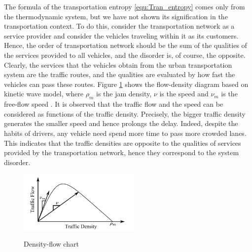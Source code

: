 \documentclass[preprint,authoryear,12pt]{elsarticle}
\begin{document}

The formula of the transportation entropy \eqref{equ:Tran_entropy} comes only from the thermodynamic system, but we have not shown its signification in the transportation context. To do this, consider the transportation network as a service provider and consider the vehicles traveling within it as its customers. Hence, the order of transportation network should be the sum of the qualities of the services provided to all vehicles, and the disorder is, of course, the opposite. Clearly, the services that the vehicles obtain from the urban transportation system are the traffic routes, and the qualities are evaluated by how fast the vehicles can pass these routes. Figure \ref{fig:d_q} shows the flow-density diagram based on kinetic wave model, where $\rho_m$ is the jam density, $\nu$ is the speed and $\nu_m$ is the free-flow speed \citep{ukkusuri_robust_2010}. It is observed that the traffic flow and the speed can be considered as functions of the traffic density. Precisely, the bigger traffic density generates the smaller speed and hence prolongs the delay. Indeed, despite the habits of drivers, any vehicle need spend more time to pass more crowded lanes. This indicates that the traffic densities are opposite to the qualities of services provided by the transportation network, hence they correspond to the system disorder.

\begin{figure}[ht]
  \centering
  \includegraphics[height=3cm]{pics/d-q}\\
  \caption{Density-flow chart}
  \label{fig:d_q}
\end{figure}
\end{document}
